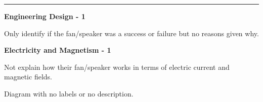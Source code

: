 \documentclass[14pt, fleqn, paper=letter, oneside]{scrartcl}
\begin{document}
\vspace{2mm}
\rule{\textwidth}{1pt}

\noindent
\begin{minipage}[t]{0.48\textwidth}
\hfill \textbf{Engineering Design - 1}\hfill\mbox{}

\vspace{-4mm}
\begin{checklist}[leftmargin=*]
\item Only identify if the fan/speaker was a success or failure but no reasons given why.

\end{checklist}

\end{minipage}
\hfill\vline\hfill
\begin{minipage}[t]{0.48\textwidth}
\hfill \textbf{Electricity and Magnetism - 1}\hfill\mbox{}

\vspace{-4mm}
\begin{checklist}[leftmargin=*]
\item Not explain how their fan/speaker works in terms of electric current and magnetic fields.

\item Diagram with no labels or no description.

\end{checklist}

\end{minipage}

\clearpage
\end{document}
